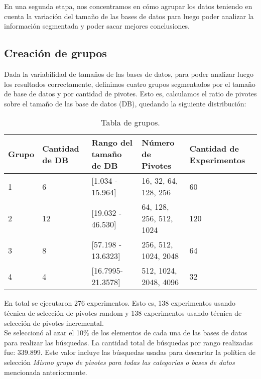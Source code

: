 En una segunda etapa,  nos concentramos en c\'omo agrupar los datos teniendo en cuenta la variaci\'on del tama\~no de las bases de datos para luego poder analizar la informaci\'on segmentada y poder sacar mejores conclusiones.

\subsection{Creaci\'on de grupos}

Dada la variabilidad de tamaños de las bases de datos, para poder analizar luego los resultados correctamente, definimos cuatro grupos segmentados por el tamaño de base de datos y por cantidad de pivotes. Esto es, calculamos el ratio de pivotes sobre el tamaño de las base de datos (DB), quedando la siguiente distribuci\'on:

\begin{table}[htbp]
\begin{center}
\begin{tabular}{|p{1.1cm}|p{1.8cm}|p{3.2cm}|p{2.2cm}|p{2.5cm}|}
\hline
Grupo & 
Cantidad de DB & 
Rango del tama\~no de DB & 
N\'umero de Pivotes &  
Cantidad de Experimentos\\
\hline \hline
1 & 
6 & 
[1.034 - 15.964] & 
16, 32, 64, 128, 256 & 
60  \\ \hline
2 &
12 &
[19.032 - 46.530] &
64, 128, 256, 512, 1024 &
120  \\ \hline
3 &
8 &
[57.198 - 13.6323] &
256, 512, 1024, 2048 &
64  \\ \hline
4 &
4 &
[16.7995- 21.3578] &
512, 1024, 2048, 4096 &
32  \\ \hline
\end{tabular}
\caption{Tabla de grupos.}
\label{tabla:grupos}
\end{center}
\end{table}

En total se ejecutaron 276 experimentos. Esto es, 138 experimentos usando t\'ecnica de selecci\'on de pivotes random y 138 experimentos usando t\'ecnica de selecci\'on de pivotes incremental.\\

Se seleccion\'o al azar el 10\% de los elementos de cada una de las bases de datos para realizar las b\'usquedas. La cantidad total de b\'usquedas por rango realizadas fue: 339.899. Este valor incluye las b\'usquedas usadas para descartar la pol\'itica de selecci\'on \textit{Mismo grupo de pivotes para todas las categor\'ias o bases de datos} mencionada anteriormente.\\

